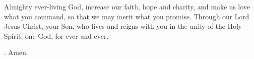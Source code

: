 \lettrine[lines=3]{A}{}lmighty ever-living God, increase our faith, hope and charity, and make us love what you command, so that we may merit what you promise. Through our Lord Jesus Christ, your Son, who lives and reigns with you in the unity of the Holy Spirit, one God, for ever and ever. \par \Rbar. Amen. 
